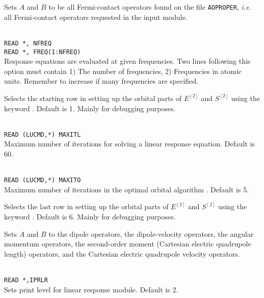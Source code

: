 \begin{description}
\item{} Sets $A$ and $B$ to be all Fermi-contact operators
  found on the file \verb|AOPROPER|, {\it i.e.\/} all Fermi-contact
  operators requested in the  input module.

\item{}\\
\verb|READ *, NFREQ|\\
\verb|READ *, FREQ(1:NFREQ)|\\
Response equations are evaluated at given
frequencies. Two lines following 
this option must contain 1) The number of frequencies, 2) Frequencies
in atomic units.
Remember to increase  if many frequencies are specified.

\item{} Selects the starting row in setting up the orbital
  parts of $E^{\left[2\right]}$
  and $S^{\left[2\right]}$ using the keyword . Default is
  1. Mainly for debugging purposes.

\item{}\\
\verb|READ (LUCMD,*) MAXITL|\\
Maximum number of iterations for solving a linear response 
equation. Default is 60.

\item{}\\
\verb|READ (LUCMD,*) MAXITO|\\
Maximum number of iterations in the optimal orbital
algorithm
\cite{tuhjahjajpjjcp84}. 
Default is 5.

\item{} Selects the last row in setting up the orbital
  parts of $E^{\left[2\right]}$
  and $S^{\left[2\right]}$ using the keyword . Default is
  6. Mainly for debugging purposes.

\item{}
Sets $A$ and $B$ to the dipole operators,
the dipole-velocity operators,
the angular momentum operators,
the second-order moment (Cartesian electric quadrupole
length) operators, and
the Cartesian electric quadrupole velocity operators.

\item{}\\
\verb|READ *,IPRLR|\\
Sets print level for linear response module. Default is 2.
 

\end{description}
